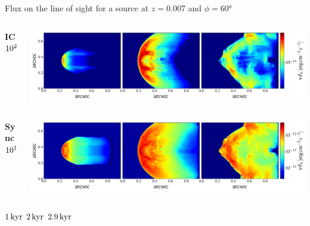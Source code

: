\begin{frame}{Flux on the line of sight for a source at $z=0.007$ and $\phi=60$°}
	\begin{columns}
		\begin{column}{0.1\textwidth}
				{\small {\bf IC} \\$10^{24}\,{\rm Hz}$  }
		\end{column}
		\begin{column}{\textwidth}
	\includegraphics[width=\linewidth]{images/2dmaps/2Dmap_flux_freq_24_dist_31_phi_60_ic.pdf}
		\end{column}
	\end{columns}
	\begin{columns}
		\begin{column}{0.1\textwidth}
				{\small{\bf Sync} \\ $10^{18}\,{\rm Hz}$}
		\end{column}
		\begin{column}{\textwidth}

	\includegraphics[width=\linewidth]{images/2dmaps/2Dmap_flux_freq_18_dist_31_phi_60_sync.pdf}
		\end{column}
	\end{columns}
	\vspace{8pt}
		\hspace{70pt} $1\,{\rm kyr}$ \hspace{60pt} $2\,{\rm kyr}$ \hspace{60pt} $2.9\,{\rm kyr}$
\end{frame}

